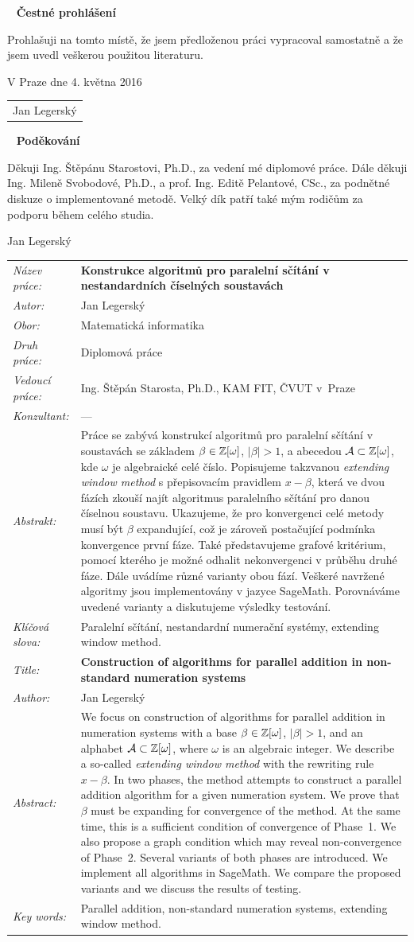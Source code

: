 \documentclass[a4paper, 11pt, twoside, openright]{report}
\theoremstyle{definition}
\newcommand{\obor}{Matematická informatika}
\newcommand{\nazevcz}{Konstrukce algoritm\r u pro paraleln\'i s\v c\'it\'an\'i  v nestandardn\'ich \v c\'iseln\'ych soustav\'ach}
\newcommand{\nazeven}{Construction of algorithms for parallel addition   in non-standard numeration systems}
\newcommand{\autor}{Jan Legersk\'y}
\newcommand{\vedouci}{Ing. \v St\v ep\'an Starosta, Ph.D.}
\newcommand{\pracovisteVed}{KAM FIT, \v CVUT v~Praze}
\newcommand{\konzultant}{---}
\newcommand{\klicova}{Paraleln\'i s\v c\'it\'an\'i, nestandardn\'i numera\v cn\'i syst\'emy, extending window method.}  %
\newcommand{\keyword}{Parallel addition, non-standard numeration systems, extending window method.}
\newcommand{\abstrCZ}%
{Práce se zabývá konstrukcí algoritmů pro paralelní sčítání v soustavách se základem $\beta\in\mathbb{Z}[\omega]$, $|\beta|>1$, a abecedou $\mathcal{A}\subset\mathbb{Z}[\omega]$, kde $\omega$ je algebraické celé číslo. Popisujeme takzvanou \emph{extending window method} s přepisovacím pravidlem $x-\beta$, která ve dvou fázích zkouší najít algoritmus paralelního sčítání pro danou číselnou soustavu. Ukazujeme, že pro konvergenci celé metody musí být $\beta$ expandující, což je zároveň postačující podmínka konvergence první fáze. Také představujeme grafové kritérium, pomocí kterého je možné odhalit nekonvergenci v průběhu druhé fáze. Dále uvádíme různé varianty obou fází. Veškeré navržené algoritmy jsou implementovány v jazyce SageMath. Porovnáváme uvedené varianty a diskutujeme výsledky testování.
}
\newcommand{\abstrEN}{
We focus on  construction of algorithms for parallel addition in numeration systems with a base $\beta\in\Zomega$, $|\beta|>1$, and an alphabet $\A\subset\Zomega$, where  $\omega$ is an algebraic integer. We describe a so-called \emph{extending window method} with the  rewriting rule $x-\beta$. In two phases, the method attempts to construct a parallel addition algorithm for a given numeration system. We prove that $\beta$ must be expanding for convergence of the method. At the same time, this is a sufficient condition of convergence of Phase~1. We also propose a graph condition which may reveal non-convergence of Phase~2.  Several variants of both phases are introduced. We implement all algorithms in SageMath. We compare the proposed variants and we discuss the results of testing.
}
\begin{document}
\begin{titlepage}
\thispagestyle{empty}
~
\vfill
\noindent\textbf{Čestné prohlášení}
\vspace{0.5cm}

Prohla\v suji na tomto m\'ist\v e, \v ze jsem p\v redlo\v zenou pr\'aci vypracoval samostatn\v e a \v ze jsem uvedl ve\v skerou pou\v zitou literaturu.
\vspace{1.5cm}

\noindent
\vspace{5mm}V Praze dne 4. května 2016\hfill
	\begin{tabular}{c}
	\\[40pt]
	\autor
	\end{tabular}
\cleardoublepage


\thispagestyle{empty}
~
\vfill
\noindent\textbf{Pod\v ekov\'an\'i}
\vspace{0.5cm}

Děkuji Ing. Štěpánu Starostovi, Ph.D., za vedení mé diplomové práce. Dále děkuji Ing. Mileně Svobodové, Ph.D., a prof. Ing. Editě Pelantové, CSc., za  podnětné diskuze o implementované metodě. Velký dík patří také mým rodičům za podporu během celého studia.

\begin{flushright}
\autor
\end{flushright}
\cleardoublepage


\thispagestyle{empty}

\noindent
\begin{tabular}{lp{}}
  {\em N\'azev pr\'ace:} & \bf \nazevcz \\[4mm]
  {\em Autor:} & \autor \\[4mm]
  {\em Obor:} & \obor \\[4mm]
  {\em Druh pr\'ace:} & Diplomová práce \\[4mm]
  {\em Vedoucí práce:} & \vedouci, \pracovisteVed \\[4mm]
  {\em Konzultant:} & \konzultant \\[4mm]
  {\em Abstrakt:} & \abstrCZ \\[4mm]
  {\em Kl\'i\v cov\'a slova:} & \klicova \\[20mm]

  {\em Title:} & \bf \nazeven \\[4mm]
  {\em Author:} & \autor \\[4mm]
  {\em Abstract:} & \abstrEN \\[4mm]
  {\em Key words:} & \keyword
\end{tabular}
\cleardoublepage


\thispagestyle{empty}
\renewcommand\contentsname{\vspace{-3cm} Contents \vspace{-0.8cm}}
\tableofcontents
\thispagestyle{empty}

\cleardoublepage
\thispagestyle{empty}

\thispagestyle{empty}
\cleardoublepage
\end{titlepage}
\end{document}
